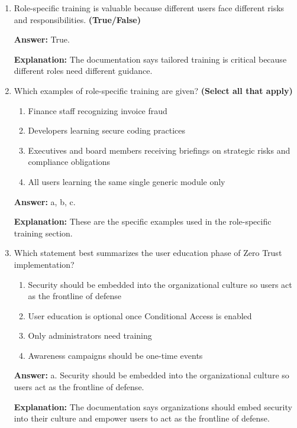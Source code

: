 \documentclass[10pt]{article}
\begin{document}
\begin{enumerate}[leftmargin=*]
\textbf{Explanation:} These are the exact concepts listed in the documentation.

\item Role-specific training is valuable because different users face different risks and responsibilities. \textbf{(True/False)}

\textbf{Answer:} True.

\textbf{Explanation:} The documentation says tailored training is critical because different roles need different guidance.

\item Which examples of role-specific training are given? \textbf{(Select all that apply)}
\begin{enumerate}[label=\alph*., leftmargin=1.5em]
\item Finance staff recognizing invoice fraud
\item Developers learning secure coding practices
\item Executives and board members receiving briefings on strategic risks and compliance obligations
\item All users learning the same single generic module only
\end{enumerate}
\textbf{Answer:} a, b, c.

\textbf{Explanation:} These are the specific examples used in the role-specific training section.

\item Which statement best summarizes the user education phase of Zero Trust implementation?
\begin{enumerate}[label=\alph*., leftmargin=1.5em]
\item Security should be embedded into the organizational culture so users act as the frontline of defense
\item User education is optional once Conditional Access is enabled
\item Only administrators need training
\item Awareness campaigns should be one-time events
\end{enumerate}
\textbf{Answer:} a. Security should be embedded into the organizational culture so users act as the frontline of defense.

\textbf{Explanation:} The documentation says organizations should embed security into their culture and empower users to act as the frontline of defense.

\end{enumerate}
\clearpage
\end{document}
